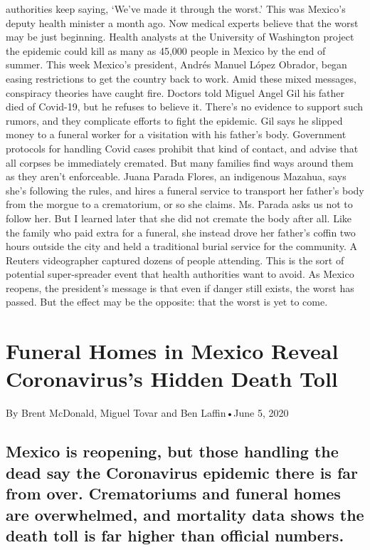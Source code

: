\begin{itemize}
  authorities keep saying, `We've made it through the worst.' This was
  Mexico's deputy health minister a month ago. Now medical experts
  believe that the worst may be just beginning. Health analysts at the
  University of Washington project the epidemic could kill as many as
  45,000 people in Mexico by the end of summer. This week Mexico's
  president, Andrés Manuel López Obrador, began easing restrictions to
  get the country back to work. Amid these mixed messages, conspiracy
  theories have caught fire. Doctors told Miguel Angel Gil his father
  died of Covid-19, but he refuses to believe it. There's no evidence to
  support such rumors, and they complicate efforts to fight the
  epidemic. Gil says he slipped money to a funeral worker for a
  visitation with his father's body. Government protocols for handling
  Covid cases prohibit that kind of contact, and advise that all corpses
  be immediately cremated. But many families find ways around them as
  they aren't enforceable. Juana Parada Flores, an indigenous Mazahua,
  says she's following the rules, and hires a funeral service to
  transport her father's body from the morgue to a crematorium, or so
  she claims. Ms. Parada asks us not to follow her. But I learned later
  that she did not cremate the body after all. Like the family who paid
  extra for a funeral, she instead drove her father's coffin two hours
  outside the city and held a traditional burial service for the
  community. A Reuters videographer captured dozens of people attending.
  This is the sort of potential super-spreader event that health
  authorities want to avoid. As Mexico reopens, the president's message
  is that even if danger still exists, the worst has passed. But the
  effect may be the opposite: that the worst is yet to come.
\end{itemize}

\hypertarget{funeral-homes-in-mexico-reveal-coronaviruss-hidden-death-toll-1}{%
\section{Funeral Homes in Mexico Reveal Coronavirus's Hidden Death
Toll}\label{funeral-homes-in-mexico-reveal-coronaviruss-hidden-death-toll-1}}

By Brent McDonald, Miguel Tovar and Ben Laffin•June 5, 2020

\hypertarget{mexico-is-reopening-but-those-handling-the-dead-say-the-coronavirus-epidemic-there-is-far-from-over-crematoriums-and-funeral-homes-are-overwhelmed-and-mortality-data-shows-the-death-toll-is-far-higher-than-official-numbers-1}{%
\subsection{Mexico is reopening, but those handling the dead say the
Coronavirus epidemic there is far from over. Crematoriums and funeral
homes are overwhelmed, and mortality data shows the death toll is far
higher than official
numbers.}\label{mexico-is-reopening-but-those-handling-the-dead-say-the-coronavirus-epidemic-there-is-far-from-over-crematoriums-and-funeral-homes-are-overwhelmed-and-mortality-data-shows-the-death-toll-is-far-higher-than-official-numbers-1}}


